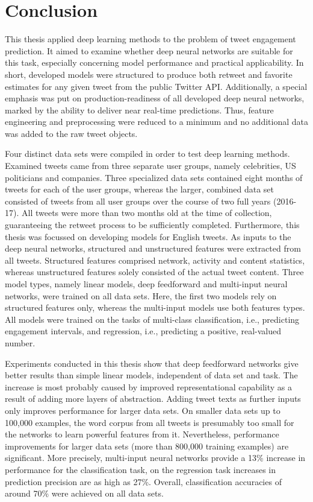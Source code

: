 \section{Conclusion}
\label{ch:conclusion}

This thesis applied deep learning methods to the problem of tweet engagement
prediction.
It aimed to examine whether deep neural networks are suitable for this task, 
especially concerning model performance and practical applicability.
In short, developed models were structured to produce both retweet and favorite
estimates for any given tweet from the public Twitter API.
Additionally, a special emphasis was put on production-readiness of all
developed deep neural networks, marked by the ability to deliver near real-time
predictions.
Thus, feature engineering and preprocessing were reduced to a minimum and no
additional data was added to the raw tweet objects.

Four distinct data sets were compiled in order to test deep learning methods.
Examined tweets came from three separate user groups, namely celebrities, US
politicians and companies.
Three specialized data sets contained eight months of tweets for each of the user
groups, whereas the larger, combined data set consisted of tweets from all
user groups over the course of two full years (2016-17).
All tweets were more than two months old at the time of collection, guaranteeing
the retweet process to be sufficiently completed.
Furthermore, this thesis was focussed on developing models for English tweets.
As inputs to the deep neural networks, structured and unstructured features
were extracted from all tweets.
Structured features comprised network, activity and content statistics, whereas
unstructured features solely consisted of the actual tweet content.
Three model types, namely linear models, deep feedforward and multi-input
neural networks, were trained on all data sets.
Here, the first two models rely on structured features only, whereas the multi-input
models use both features types.
All models were trained on the tasks of multi-class classification, i.e.,
predicting engagement intervals, and regression, i.e., predicting a positive, real-valued
number.

Experiments conducted in this thesis show that deep feedforward networks
give better results than simple linear models, independent of data set and task.
The increase is most probably caused by improved representational capability
as a result of adding more layers of abstraction.
Adding tweet texts as further inputs only improves performance for larger data
sets.
On smaller data sets up to 100,000 examples, the word corpus from all tweets
is presumably too small for the networks to learn powerful features from it.
Nevertheless, performance improvements for larger data sets (more than 800,000
training examples) are significant.
More precisely, multi-input neural networks provide a 13\% increase in performance
for the classification task, on the regression task increases in prediction
precision are as high as 27\%.
Overall, classification accuracies of around 70\% were achieved on all data sets.
